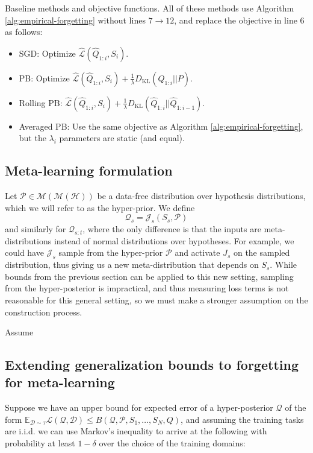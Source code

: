 \documentclass[letterpaper]{article}
\theoremstyle{definition}
\begin{document}
Baseline methods and objective functions. All of these methods use Algorithm \ref{alg:empirical-forgetting} without lines $7\rightarrow 12$, and replace the objective in line $6$ as follows:
\begin{itemize}
    \item SGD: Optimize $\hat{\mathcal{L}}(\hat{Q}_{1:i}, S_i)$.
    \item PB: Optimize $\hat{\mathcal{L}}(\hat{Q}_{1:i}, S_i)+\frac{1}{\lambda}D_{\mathrm{KL}}(\hat{Q}_{1:i}||P)$.
    \item Rolling PB: $\hat{\mathcal{L}}(\hat{Q}_{1:i}, S_i)+\frac{1}{\lambda}D_{\mathrm{KL}}(\hat{Q}_{1:i}||\hat{Q}_{1:i-1})$.
    \item Averaged PB: Use the same objective as Algorithm \ref{alg:empirical-forgetting}, but the $\lambda_i$ parameters are static (and equal).
\end{itemize}


\subsection{Meta-learning formulation}

Let $\mathcal{P}\in\mathcal{M}(\mathcal{M}(\mathcal{H}))$ be a data-free distribution over hypothesis distributions, which we will refer to as the hyper-prior. We define 
$$\mathcal{Q}_s=\mathcal{J}_s(S_s,\mathcal{P})$$ and similarly for $\mathcal{Q}_{s:t}$, where the only difference is that the inputs are meta-distributions instead of normal distributions over hypotheses. For example, we could have $\mathcal{J}_s$ sample from the hyper-prior $\mathcal{P}$ and activate $J_s$ on the sampled distribution, thus giving us a new meta-distribution that depends on $S_s$. While bounds from the previous section can be applied to this new setting, sampling from the hyper-posterior is impractical, and thus measuring loss terms is not reasonable for this general setting, so we must make a stronger assumption on the construction process.

Assume 

\subsection{Extending generalization bounds to forgetting for meta-learning}

Suppose we have an upper bound for expected error of a hyper-posterior $\mathcal{Q}$ of the form $\mathbb{E}_{\mathcal{D}\sim \tau}\mathcal{L}(\mathcal{Q}, \mathcal{D})\leq B(\mathcal{Q},\mathcal{P}, S_1,\ldots, S_N, Q)$, and assuming the training tasks are i.\!i.\!d. we can use Markov's inequality to arrive at the following with probability at least $1-\delta$ over the choice of the training domains:
\end{document}
